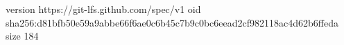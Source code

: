 version https://git-lfs.github.com/spec/v1
oid sha256:d81bfb50e59a9abbe66f6ae0c6b45c7b9c0bc6eead2cf982118ac4d62b6ffeda
size 184
